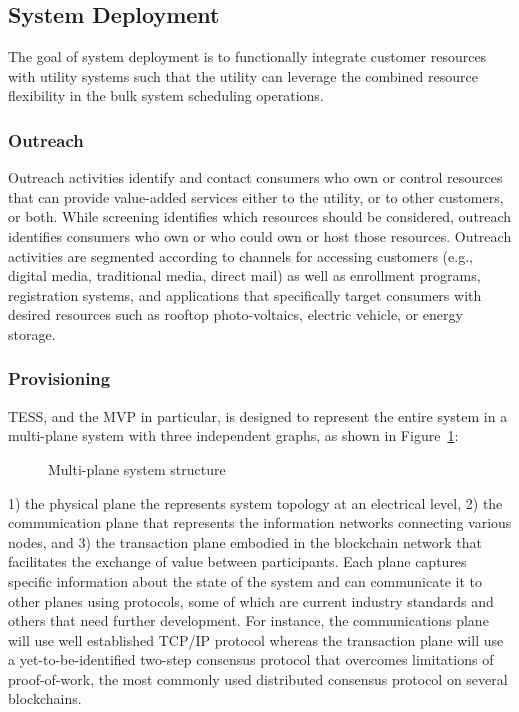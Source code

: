 \documentclass[10pt,twocolumn]{article}
\begin{document}
\subsection{System Deployment}

The goal of system deployment is to functionally integrate customer resources with utility systems such that the utility can leverage the combined resource flexibility in the bulk system scheduling operations.

\subsubsection{Outreach}

Outreach activities identify and contact consumers who own or control resources that can provide value-added services either to the utility, or to other customers, or both. While screening identifies which resources should be considered, outreach identifies consumers who own or who could own or host those resources. Outreach activities are segmented according to  channels for accessing customers (e.g., digital media, traditional media, direct mail) as well as enrollment programs, registration systems, and applications that specifically target consumers with desired resources such as rooftop photo-voltaics, electric vehicle, or energy storage. 

\subsubsection{Provisioning}

TESS, and the MVP in particular, is designed to represent the entire system in a multi-plane system with three independent graphs, as shown in Figure~\ref{fig:planes}: 
\begin{figure}[!t]
    \centering
    \caption{Multi-plane system structure}
    \label{fig:planes}
\end{figure}
1) the physical plane the represents system topology at an electrical level, 2) the communication plane that represents the information networks connecting various nodes, and 3) the transaction plane embodied in the blockchain network that facilitates the exchange of value between participants. Each plane captures specific information about the state of the system and can communicate it to other planes using protocols, some of which are current industry standards and others that need further development. For instance, the communications plane will use well established TCP/IP protocol whereas the transaction plane will use a yet-to-be-identified two-step consensus protocol that overcomes limitations of proof-of-work, the most commonly used distributed consensus protocol on several blockchains. 
\end{document}
